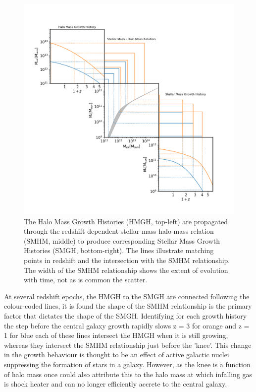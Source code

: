 \begin{figure}[h]
    \centering
    \includegraphics[width = \linewidth]{Figures/Chapter2/HMGH_to_SMGH.png}
    \caption{The Halo Mass Growth Histories (HMGH, top-left) are propagated through the redshift dependent stellar-mass-halo-mass relation (SMHM, middle) to produce corresponding Stellar Mass Growth Histories (SMGH, bottom-right). The lines illustrate matching points in redshift and the intersection with the SMHM relationship. The width of the SMHM relationship shows the extent of evolution with time, not as is common the scatter.}
    \label{fig:Cent_Mass_PP}
\end{figure}

At several redshift epochs, the HMGH to the SMGH are connected following the colour-coded lines, it is found the shape of the SMHM relationship is the primary factor that dictates the shape of the SMGH. Identifying for each growth history the step before the central galaxy growth rapidly slows z = 3 for orange and z = 1 for blue each of these lines intersect the HMGH when it is still growing, whereas they intersect the SMHM relationship just before the 'knee'. This change in the growth behaviour is thought to be an effect of active galactic nuclei suppressing the formation of stars in a galaxy. However, as the knee is a function of halo mass once could also attribute this to the halo mass at which infalling gas is shock heater and can no longer efficiently accrete to the central galaxy.